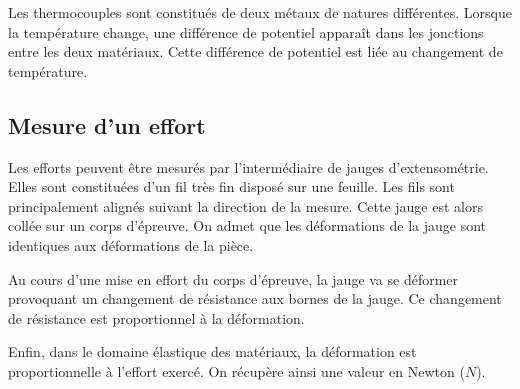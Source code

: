 \documentclass[10pt]{article}
\begin{document}
Les thermocouples sont constitués de deux métaux de natures différentes. Lorsque la température change, une différence de potentiel apparaît dans les jonctions entre les deux matériaux. Cette différence de potentiel est liée au changement de température.

\subsection{Mesure d'un effort}


\begin{minipage}[c]{.75\linewidth}
Les efforts peuvent être mesurés par l'intermédiaire de jauges d'extensométrie. Elles sont constituées d'un fil très fin disposé sur une feuille. Les fils sont principalement alignés suivant la direction de la mesure. Cette jauge est alors collée sur un corps d'épreuve. On admet que les déformations de la jauge sont identiques aux déformations de la pièce. 

Au cours d'une mise en effort du corps d'épreuve, la jauge va se déformer provoquant un changement de résistance aux bornes de la jauge. Ce changement de résistance est proportionnel à la déformation. 

Enfin, dans le domaine élastique des matériaux, la déformation est proportionnelle à l'effort exercé. On récupère ainsi une valeur en Newton ($N$).


\end{minipage}\hfill
\end{document}
